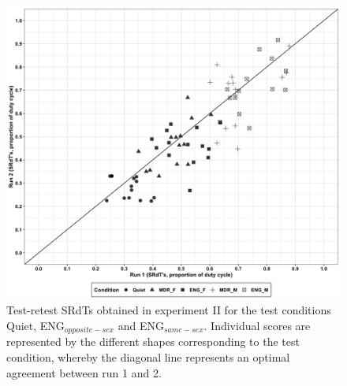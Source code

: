 \documentclass[a4paper, twoside]{templates/ociamthesis}
\begin{document}
\begin{figure}[ht]
\center
\includegraphics[width=\textwidth]{figures/Chapt1/Exp2_Run1_Run2_2021-01-29.png}
\caption{\label{fig:Exp2_2runs}{Test-retest SRdTs obtained in experiment II for the test conditions Quiet, ENG$_{opposite-sex}$ and ENG$_{same-sex}$. Individual scores are represented by the different shapes corresponding to the test condition, whereby the diagonal line represents an optimal agreement between run 1 and 2.}}
\end{figure} 
\end{document}
